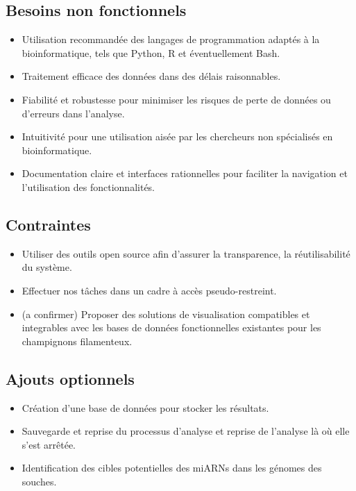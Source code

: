 \documentclass{report}
\begin{document}
\subsection{Besoins non fonctionnels}
\begin{itemize}
    \item Utilisation recommandée des langages de programmation adaptés à la bioinformatique, tels que Python, R et éventuellement Bash.
    \item Traitement efficace des données dans des délais raisonnables.
    \item Fiabilité et robustesse pour minimiser les risques de perte de données ou d'erreurs dans l'analyse.
    \item Intuitivité pour une utilisation aisée par les chercheurs non spécialisés en bioinformatique.
    \item Documentation claire et interfaces rationnelles pour faciliter la navigation et l'utilisation des fonctionnalités.
\end{itemize}

\subsection{Contraintes}
\begin{itemize}
    \item Utiliser des outils open source afin d'assurer la transparence, la réutilisabilité du système.
    \item Effectuer nos tâches dans un cadre à accès pseudo-restreint.
    \item (a confirmer) Proposer des solutions de visualisation compatibles et integrables avec les bases de données fonctionnelles existantes pour les champignons filamenteux.
\end{itemize}

\subsection{Ajouts optionnels}
\begin{itemize}
    \item Création d'une base de données pour stocker les résultats.
    \item Sauvegarde et reprise du processus d'analyse et reprise de l'analyse là où elle s'est arrêtée.
    \item Identification des cibles potentielles des miARNs dans les génomes des souches.
\end{itemize}
\end{document}

